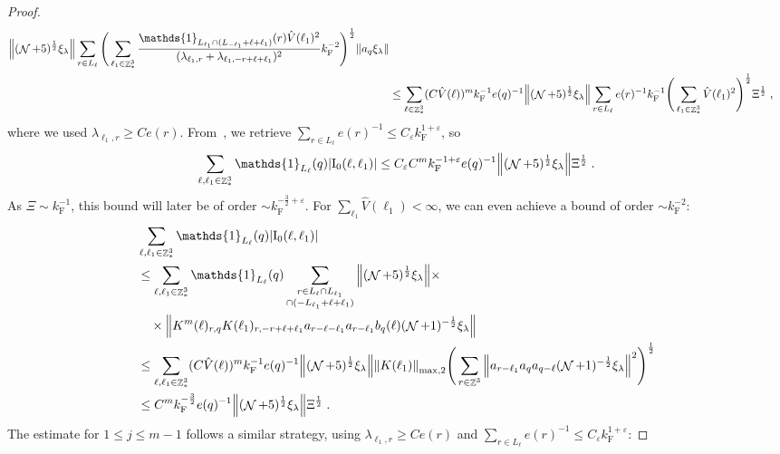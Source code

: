 \documentclass[12pt,a4paper]{article}
\numberwithin{equation}{section}
\newcommand{\1}{\mathbb{I}}
\newcommand{\F}{\mathrm{F}}
\newcommand{\I}{\mathrm{I}}
\DeclareMathOperator{\Z}{\mathbb{Z}}
\DeclareMathOperator{\NN}{\mathcal{N}}
\newcommand{\half}{\frac{1}{2}}
\theoremstyle{plain}
\theoremstyle{definition}
\theoremstyle{remark}
\theoremstyle{plain}
\theoremstyle{definition}
\theoremstyle{remark}
\begin{document}
\begin{proof}
{\begin{align}
	 	\norm{ (\NN+5)^{\half} \xi_\lambda}
	 	\sum_{r \in L_\ell} \Bigg( \sum_{\ell_1 \in \Z^3_*} \frac{\mathds{1}_{L_{\ell_1} \cap (L_{-\ell_1}+\ell+\ell_1)}(r) \hat{V}(\ell_1)^2}{(\lambda_{\ell_1,r} + \lambda_{\ell_1,-r+\ell+\ell_1})^2} k_{\F}^{-2} \Bigg)^{\half} \norm{ a_q \xi_\lambda } \nonumber\\
	 &\leq \sum_{\ell \in \Z^3_*} (C \hat{V}(\ell))^m k_{\F}^{-1} e(q)^{-1}
	 	\norm{ (\NN+5)^{\half} \xi_\lambda}
	 	\sum_{r \in L_\ell} e(r)^{-1} k_{\F}^{-1} \Bigg( \sum_{\ell_1 \in \Z^3_*} \hat{V}(\ell_1)^2 \Bigg)^{\half} \Xi^\half \;,
\end{align}
where we used $ \lambda_{\ell_1,r} \ge C e(r) $. From~\cite[Lemma~3.2]{CHN24}, we retrieve $ \sum_{r \in L_\ell} e(r)^{-1} \le C_\varepsilon k_{\F}^{1+\varepsilon} $, so
\begin{align}
	\sum_{\ell,\ell_1 \in \Z^3_*} \mathds{1}_{L_\ell}(q) |\I_0(\ell, \ell_1)|
	\leq C_\varepsilon C^m k_{\F}^{-1+\varepsilon} e(q)^{-1}
	 	\norm{ (\NN+5)^{\half} \xi_\lambda}
	 	\Xi^{\half}	\;.
\label{eq:estEQ1121_Coulomb}
\end{align}
As $ \Xi \sim k_{\F}^{-1} $, this bound will later be of order $ \sim k_{\F}^{-\frac 32 + \varepsilon} $. For $ \sum_{\ell_1} \hat{V}(\ell_1) < \infty $, we can even achieve a bound of order $ \sim k_{\F}^{-2} $:
\begin{align}
	&\sum_{\ell,\ell_1 \in \Z^3_*} \mathds{1}_{L_\ell}(q) |\I_0(\ell, \ell_1)| \nonumber\\
	&\leq \sum_{\ell,\ell_1 \in \Z^3_*} \mathds{1}_{L_\ell}(q) \sum\limits_{\substack{r\in L_{\ell} \cap L_{\ell_1}\\ \cap (-L_{\ell_1}+\ell+\ell_1)}}
		\norm{ (\NN+5)^{\half} \xi_\lambda} \times \nonumber\\
	&\quad \times \norm{ K^m(\ell )_{r,q} K(\ell_1)_{r,-r+\ell+\ell_1} a_{r-\ell-\ell_1} a_{r-\ell_1} b_{q}(\ell) (\NN+1)^{-\half} \xi_\lambda }\nonumber\\
	 &\leq \sum_{\ell,\ell_1 \in \Z^3_*} (C \hat{V}(\ell))^m k_{\F}^{-1} e(q)^{-1}
	 	\norm{ (\NN+5)^{\half} \xi_\lambda} \norm{K(\ell_1) }_{\max,2}
	 	\Bigg( \sum\limits_{r\in \Z^3} \norm{ a_{r-\ell_1} a_q a_{q-\ell} (\NN+1)^{-\half} \xi_\lambda }^2 \Bigg)^\half \nonumber\\
	 &\leq C^m
	 	k_{\F}^{-\frac 32} e(q)^{-1}
	 	\norm{(\NN+5)^{\half} \xi_\lambda}
	 	\Xi^{\half} \;.
\label{eq:estEQ1121}
\end{align}
}
The estimate for $ 1 \le j \le m-1 $ follows a similar strategy, using $ \lambda_{\ell_1,r} \ge C e(r) $ and $ \sum_{r \in L_\ell} e(r)^{-1} \le C_\varepsilon k_{\F}^{1+\varepsilon} $:

\end{proof}
\end{document}
